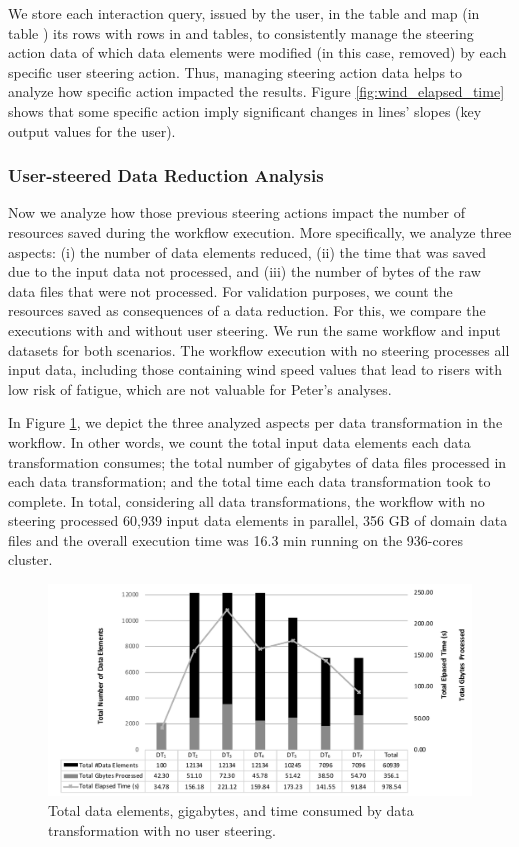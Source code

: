 We store each interaction query, issued by the user, in the
 table and map (in table
) its rows with rows in  and
 tables, to consistently manage the steering action data of which data elements were
modified (in this case, removed) by each specific user steering action. Thus,
managing steering action data helps to analyze how specific
action impacted the results. Figure \ref{fig:wind_elapsed_time} shows that
 some specific
action imply significant changes in lines' slopes (key output
values for the user).

\subsubsection{User-steered Data Reduction Analysis}

Now we analyze how those previous steering actions impact
the number of resources saved during the workflow execution. More
specifically, we analyze three aspects: (i) the number of data elements
reduced, (ii) the time that was saved due to the input data not
processed, and (iii) the number of bytes of the raw data files that were
not processed.
For validation purposes, we count the resources saved
as consequences of a data reduction. For this, we compare the executions
with and without user steering. We run the same workflow and input
datasets for both scenarios. The workflow execution with no steering
processes all input data, including those containing wind speed values
that lead to risers with low risk of fatigue, which are not valuable for
Peter's analyses.

In Figure \ref{fig:data_red_graficos_total}, we depict the three analyzed aspects per data transformation in the
workflow. In other words, we count the total input data elements each
data transformation consumes; the total number of gigabytes of data files processed
in each data transformation; and the total time each data transformation took to complete. In
total, considering all data transformations, the workflow with no steering
processed 60,939 input data elements in parallel, 356 GB of domain data
files and the overall execution time was 16.3 min running on the
936-cores cluster.


\begin{figure}[H]
    \centering
    \includegraphics[width=\textwidth,keepaspectratio]{img/data-elements-per-DT.pdf}
    \caption{Total data elements, gigabytes, and time consumed by data transformation with no user steering.}
    \label{fig:data_red_graficos_total}
\end{figure}


